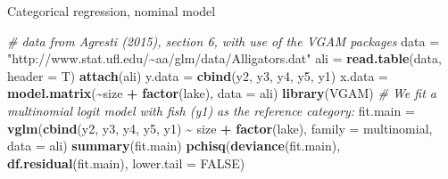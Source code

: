 \documentclass[
  ignorenonframetext,
]{beamer}
\newenvironment{Shaded}{\begin{snugshade}}{\end{snugshade}}
\newcommand{\AttributeTok}[1]{\textcolor[rgb]{0.13,0.29,0.53}{#1}}
\newcommand{\CommentTok}[1]{\textcolor[rgb]{0.56,0.35,0.01}{\textit{#1}}}
\newcommand{\ConstantTok}[1]{\textcolor[rgb]{0.56,0.35,0.01}{#1}}
\newcommand{\FunctionTok}[1]{\textcolor[rgb]{0.13,0.29,0.53}{\textbf{#1}}}
\newcommand{\NormalTok}[1]{#1}
\newcommand{\OtherTok}[1]{\textcolor[rgb]{0.56,0.35,0.01}{#1}}
\newcommand{\SpecialCharTok}[1]{\textcolor[rgb]{0.81,0.36,0.00}{\textbf{#1}}}
\newcommand{\StringTok}[1]{\textcolor[rgb]{0.31,0.60,0.02}{#1}}
\begin{document}
\begin{frame}[fragile]
\begin{block}{Categorical regression, nominal model}
\protect\hypertarget{categorical-regression-nominal-model}{}
\begin{Shaded}
\begin{Highlighting}[]
\CommentTok{\# data from Agresti (2015), section 6, with use of the VGAM packages}
\NormalTok{data }\OtherTok{=} \StringTok{"http://www.stat.ufl.edu/\textasciitilde{}aa/glm/data/Alligators.dat"}
\NormalTok{ali }\OtherTok{=} \FunctionTok{read.table}\NormalTok{(data, }\AttributeTok{header =}\NormalTok{ T)}
\FunctionTok{attach}\NormalTok{(ali)}
\NormalTok{y.data }\OtherTok{=} \FunctionTok{cbind}\NormalTok{(y2, y3, y4, y5, y1)}
\NormalTok{x.data }\OtherTok{=} \FunctionTok{model.matrix}\NormalTok{(}\SpecialCharTok{\textasciitilde{}}\NormalTok{size }\SpecialCharTok{+} \FunctionTok{factor}\NormalTok{(lake), }\AttributeTok{data =}\NormalTok{ ali)}
\FunctionTok{library}\NormalTok{(VGAM)}
\CommentTok{\# We fit a multinomial logit model with fish (y1) as the reference category:}
\NormalTok{fit.main }\OtherTok{=} \FunctionTok{vglm}\NormalTok{(}\FunctionTok{cbind}\NormalTok{(y2, y3, y4, y5, y1) }\SpecialCharTok{\textasciitilde{}}\NormalTok{ size }\SpecialCharTok{+} \FunctionTok{factor}\NormalTok{(lake), }\AttributeTok{family =}\NormalTok{ multinomial,}
    \AttributeTok{data =}\NormalTok{ ali)}
\FunctionTok{summary}\NormalTok{(fit.main)}
\FunctionTok{pchisq}\NormalTok{(}\FunctionTok{deviance}\NormalTok{(fit.main), }\FunctionTok{df.residual}\NormalTok{(fit.main), }\AttributeTok{lower.tail =} \ConstantTok{FALSE}\NormalTok{)}
\end{Highlighting}
\end{Shaded}


\end{block}
\end{frame}
\end{document}
